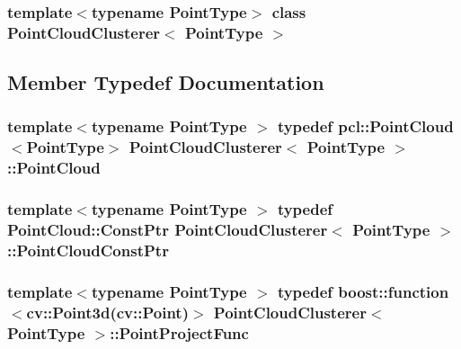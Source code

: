 \subsubsection*{template$<$typename Point\-Type$>$ class Point\-Cloud\-Clusterer$<$ Point\-Type $>$}



\subsection{\-Member \-Typedef \-Documentation}
\hypertarget{classPointCloudClusterer_aeac82c7494ccf2580112ef55d7e30b39}{
\subsubsection[{\-Point\-Cloud}]{\setlength{\rightskip}{0pt plus 5cm}template$<$typename Point\-Type $>$ typedef pcl\-::\-Point\-Cloud$<$\-Point\-Type$>$ {\bf \-Point\-Cloud\-Clusterer}$<$ \-Point\-Type $>$\-::{\bf \-Point\-Cloud}}}\label{classPointCloudClusterer_aeac82c7494ccf2580112ef55d7e30b39}
\hypertarget{classPointCloudClusterer_a042579611b15a7ae275603b624df3968}{
\subsubsection[{\-Point\-Cloud\-Const\-Ptr}]{\setlength{\rightskip}{0pt plus 5cm}template$<$typename Point\-Type $>$ typedef \-Point\-Cloud\-::\-Const\-Ptr {\bf \-Point\-Cloud\-Clusterer}$<$ \-Point\-Type $>$\-::{\bf \-Point\-Cloud\-Const\-Ptr}}}\label{classPointCloudClusterer_a042579611b15a7ae275603b624df3968}
\hypertarget{classPointCloudClusterer_adc13c5f02a2a888f33eedbc33188f202}{
\subsubsection[{\-Point\-Project\-Func}]{\setlength{\rightskip}{0pt plus 5cm}template$<$typename Point\-Type $>$ typedef boost\-::function$<$cv\-::\-Point3d(cv\-::\-Point)$>$ {\bf \-Point\-Cloud\-Clusterer}$<$ \-Point\-Type $>$\-::{\bf \-Point\-Project\-Func}}}\label{classPointCloudClusterer_adc13c5f02a2a888f33eedbc33188f202}


